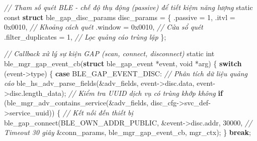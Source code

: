 \documentclass[a4paper]{extarticle}
\newenvironment{Shaded}{}{}
\newcommand{\BaseNTok}[1]{\textcolor[rgb]{0.25,0.63,0.44}{#1}}
\newcommand{\CommentTok}[1]{\textcolor[rgb]{0.38,0.63,0.69}{\textit{#1}}}
\newcommand{\ControlFlowTok}[1]{\textcolor[rgb]{0.00,0.44,0.13}{\textbf{#1}}}
\newcommand{\DataTypeTok}[1]{\textcolor[rgb]{0.56,0.13,0.00}{#1}}
\newcommand{\DecValTok}[1]{\textcolor[rgb]{0.25,0.63,0.44}{#1}}
\newcommand{\KeywordTok}[1]{\textcolor[rgb]{0.00,0.44,0.13}{\textbf{#1}}}
\newcommand{\NormalTok}[1]{#1}
\newcommand{\OperatorTok}[1]{\textcolor[rgb]{0.40,0.40,0.40}{#1}}
\begin{document}
\begin{Shaded}
\begin{Highlighting}[]
\CommentTok{// Tham số quét BLE {-} chế độ thụ động (passive) để tiết kiệm năng lượng}
\DataTypeTok{static} \DataTypeTok{const} \KeywordTok{struct}\NormalTok{ ble\_gap\_disc\_params disc\_params }\OperatorTok{=} \OperatorTok{\{}
    \OperatorTok{.}\NormalTok{passive           }\OperatorTok{=} \DecValTok{1}\OperatorTok{,}
    \OperatorTok{.}\NormalTok{itvl              }\OperatorTok{=} \BaseNTok{0x0010}\OperatorTok{,}   \CommentTok{// Khoảng cách quét}
    \OperatorTok{.}\NormalTok{window            }\OperatorTok{=} \BaseNTok{0x0010}\OperatorTok{,}   \CommentTok{// Cửa sổ quét}
    \OperatorTok{.}\NormalTok{filter\_duplicates }\OperatorTok{=} \DecValTok{1}\OperatorTok{,}        \CommentTok{// Lọc quảng cáo trùng lặp}
\OperatorTok{\};}

\CommentTok{// Callback xử lý sự kiện GAP (scan, connect, disconnect)}
\DataTypeTok{static} \DataTypeTok{int}\NormalTok{ ble\_mgr\_gap\_event\_cb}\OperatorTok{(}\KeywordTok{struct}\NormalTok{ ble\_gap\_event }\OperatorTok{*}\NormalTok{event}\OperatorTok{,} \DataTypeTok{void} \OperatorTok{*}\NormalTok{arg}\OperatorTok{)}
\OperatorTok{\{}
    \ControlFlowTok{switch} \OperatorTok{(}\NormalTok{event}\OperatorTok{{-}\textgreater{}}\NormalTok{type}\OperatorTok{)} \OperatorTok{\{}
    \ControlFlowTok{case}\NormalTok{ BLE\_GAP\_EVENT\_DISC}\OperatorTok{:}
        \CommentTok{// Phân tích dữ liệu quảng cáo}
\NormalTok{        ble\_hs\_adv\_parse\_fields}\OperatorTok{(\&}\NormalTok{adv\_fields}\OperatorTok{,}
\NormalTok{                                event}\OperatorTok{{-}\textgreater{}}\NormalTok{disc}\OperatorTok{.}\NormalTok{data}\OperatorTok{,}
\NormalTok{                                event}\OperatorTok{{-}\textgreater{}}\NormalTok{disc}\OperatorTok{.}\NormalTok{length\_data}\OperatorTok{);}
        \CommentTok{// Kiểm tra UUID dịch vụ có trùng khớp không}
        \ControlFlowTok{if} \OperatorTok{(}\NormalTok{ble\_mgr\_adv\_contains\_service}\OperatorTok{(\&}\NormalTok{adv\_fields}\OperatorTok{,}
\NormalTok{                                          disc\_cfg}\OperatorTok{{-}\textgreater{}}\NormalTok{svc\_def}\OperatorTok{{-}\textgreater{}}\NormalTok{service\_uuid}\OperatorTok{))} \OperatorTok{\{}
            \CommentTok{// Kết nối đến thiết bị}
\NormalTok{            ble\_gap\_connect}\OperatorTok{(}\NormalTok{BLE\_OWN\_ADDR\_PUBLIC}\OperatorTok{,}
                            \OperatorTok{\&}\NormalTok{event}\OperatorTok{{-}\textgreater{}}\NormalTok{disc}\OperatorTok{.}\NormalTok{addr}\OperatorTok{,}
                            \DecValTok{30000}\OperatorTok{,}           \CommentTok{// Timeout 30 giây}
                            \OperatorTok{\&}\NormalTok{conn\_params}\OperatorTok{,}
\NormalTok{                            ble\_mgr\_gap\_event\_cb}\OperatorTok{,}\NormalTok{ mgr\_ctx}\OperatorTok{);}
        \OperatorTok{\}}
        \ControlFlowTok{break}\OperatorTok{;}


\end{Highlighting}
\end{Shaded}
\end{document}
